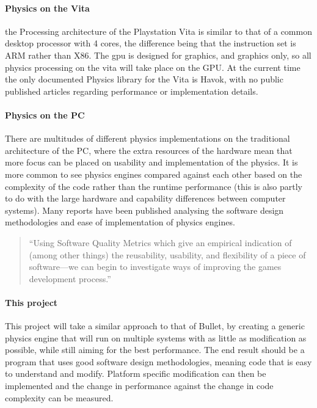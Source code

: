 \documentclass[conference]{acmsiggraph}
\begin{document}
\paragraph{Physics on the Vita}
the Processing architecture of the Playstation Vita is similar to that of a common desktop processor with 4 cores, the difference being that the instruction set is ARM rather than X86. The gpu is designed for graphics, and graphics only, so all physics processing on the vita will take place on the GPU. At the current time the only documented Physics library for the Vita is Havok, with no public published articles regarding performance or implementation details. 

\paragraph{Physics on the PC}
There are multitudes of different physics implementations on the traditional architecture of the PC, where the extra resources of the hardware mean that more focus can be placed on usability and implementation of the physics. It is more common to see physics engines compared against each other based on the complexity of the code rather than the runtime performance (this is also partly to do with the large hardware and capability differences between computer systems). Many reports have been published analysing the software design methodologies and ease of implementation of physics engines. 
\begin{quote}
``Using Software Quality Metrics which give an empirical indication of (among other
things) the reusability, usability, and flexibility of a piece of software—we can begin to
investigate ways of improving the games development process.''\cite{comparison}
\end{quote}

\paragraph{This project}
This project will take a similar approach to that of Bullet, by creating a generic physics engine that will run on multiple systems with as little as modification as possible, while still aiming for the best performance. The end result should be a program that uses good software design methodologies, meaning code that is easy to understand and modify. Platform specific modification can then be implemented and the change in performance against the change in code complexity can be measured.
\end{document}
